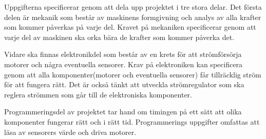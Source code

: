Uppgifterna specificerar genom att dela upp projektet i tre stora delar. Det första delen är mekanik som består av maskinens formgivning och analys av alla krafter som kommer påverkas på varje del. Kravet på mekaniken specificerar genom att varje del av maskinen ska orka bära de krafter som kommer påverka det.

Vidare ska finnas elektronikdel som består av en krets för att strömförsörja motorer och några eventuella sensorer. Krav på elektroniken kan specificera genom att alla komponenter(motorer och eventuella sensorer) får tillräcklig ström för att fungera rätt. Det är också tänkt att utveckla strömregulator som ska reglera strömmen som går till de elektroniska komponenter. 

Programmeringsdel av projektet tar hand om timingen på ett sätt att olika komponenter fungerar rätt och i rätt tid. Programmerings uppgifter omfattas att läsa av sensorers värde och driva motorer. 